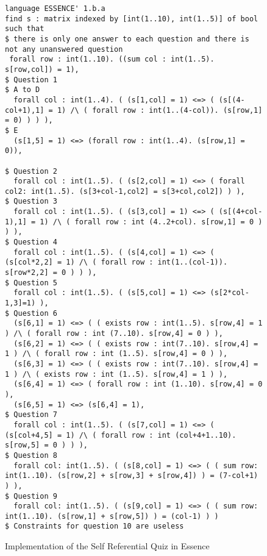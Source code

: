\begin{figure}
\caption{\label{benchmark-essence:srq}Implementation of the Self Referential Quiz in Essence}
\begin{lstlisting}
language ESSENCE' 1.b.a
find s : matrix indexed by [int(1..10), int(1..5)] of bool
such that
$ there is only one answer to each question and there is not any unanswered question
 forall row : int(1..10). ((sum col : int(1..5). s[row,col]) = 1),
$ Question 1
$ A to D
  forall col : int(1..4). ( (s[1,col] = 1) <=> ( (s[(4-col+1),1] = 1) /\ ( forall row : int(1..(4-col)). (s[row,1] = 0) ) ) ),
$ E
  (s[1,5] = 1) <=> (forall row : int(1..4). (s[row,1] = 0)),

$ Question 2
  forall col : int(1..5). ( (s[2,col] = 1) <=> ( forall col2: int(1..5). (s[3+col-1,col2] = s[3+col,col2]) ) ),
$ Question 3
  forall col : int(1..5). ( (s[3,col] = 1) <=> ( (s[(4+col-1),1] = 1) /\ ( forall row : int (4..2+col). s[row,1] = 0 ) ) ),
$ Question 4
  forall col : int(1..5). ( (s[4,col] = 1) <=> ( (s[col*2,2] = 1) /\ ( forall row : int(1..(col-1)). s[row*2,2] = 0 ) ) ),
$ Question 5
  forall col : int(1..5). ( (s[5,col] = 1) <=> (s[2*col-1,3]=1) ),
$ Question 6
  (s[6,1] = 1) <=> ( ( exists row : int(1..5). s[row,4] = 1 ) /\ ( forall row : int (7..10). s[row,4] = 0 ) ),
  (s[6,2] = 1) <=> ( ( exists row : int(7..10). s[row,4] = 1 ) /\ ( forall row : int (1..5). s[row,4] = 0 ) ),
  (s[6,3] = 1) <=> ( ( exists row : int(7..10). s[row,4] = 1 ) /\ ( exists row : int (1..5). s[row,4] = 1 ) ),
  (s[6,4] = 1) <=> ( forall row : int (1..10). s[row,4] = 0 ),
  (s[6,5] = 1) <=> (s[6,4] = 1),
$ Question 7
  forall col : int(1..5). ( (s[7,col] = 1) <=> ( (s[col+4,5] = 1) /\ ( forall row : int (col+4+1..10). s[row,5] = 0 ) ) ),
$ Question 8
  forall col: int(1..5). ( (s[8,col] = 1) <=> ( ( sum row: int(1..10). (s[row,2] + s[row,3] + s[row,4]) ) = (7-col+1) ) ),
$ Question 9
  forall col: int(1..5). ( (s[9,col] = 1) <=> ( ( sum row: int(1..10). (s[row,1] + s[row,5]) ) = (col-1) ) )
$ Constraints for question 10 are useless
\end{lstlisting} 
\end{figure}

